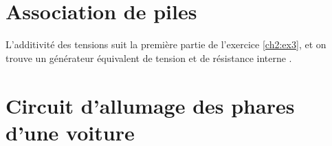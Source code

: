 \documentclass[../main/main.tex]{subfiles}
\begin{document}
\section{Association de piles}
L'additivité des tensions suit la première partie de l'exercice \ref{ch2:ex3},
et on trouve un générateur équivalent de tension  et de
résistance interne .

\section{Circuit d'allumage des phares d'une voiture}\label{ch2:ex9}
\subsection{}
\end{document}
